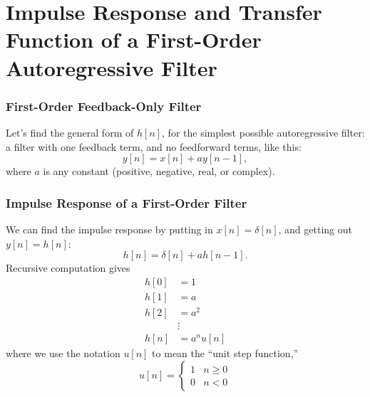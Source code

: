 \documentclass{beamer}
\begin{document}
%

\section[First-Order]{Impulse Response and Transfer Function of a First-Order Autoregressive Filter}
\setcounter{subsection}{1}

\begin{frame}
  \frametitle{First-Order Feedback-Only Filter}

  Let's find the general form of $h[n]$, for the simplest possible
  autoregressive filter: a filter with one feedback term, and no
  feedforward terms, like this:
  \[
  y[n] = x[n] + ay[n-1],
  \]
  where $a$ is any constant (positive, negative, real, or complex).
\end{frame}

\begin{frame}
  \frametitle{Impulse Response of a First-Order Filter}

  We can find the impulse response by putting in $x[n]=\delta[n]$, and
  getting out $y[n]=h[n]$:
  \[
  h[n] = \delta[n] + ah[n-1].
  \]
  Recursive computation gives
  \begin{align*}
    h[0] &= 1 \\
    h[1] &= a\\
    h[2] &= a^2\\
     & \vdots\\
    h[n] &= a^nu[n]
  \end{align*}
  where we use the notation $u[n]$ to mean the ``unit step function,''
  \[u[n] = \begin{cases}1& n\ge 0\\0 & n<0\end{cases}\]
\end{frame}
\end{document}
